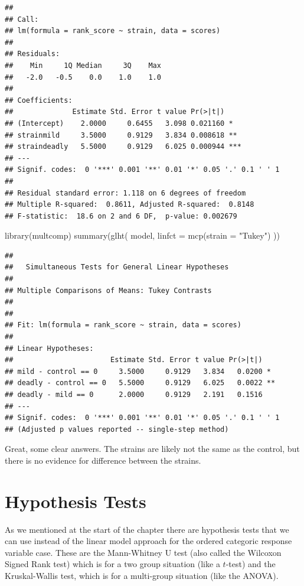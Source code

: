 \documentclass[
]{book}
\newenvironment{Shaded}{\begin{snugshade}}{\end{snugshade}}
\newcommand{\AttributeTok}[1]{\textcolor[rgb]{0.77,0.63,0.00}{#1}}
\newcommand{\FunctionTok}[1]{\textcolor[rgb]{0.00,0.00,0.00}{#1}}
\newcommand{\NormalTok}[1]{#1}
\newcommand{\StringTok}[1]{\textcolor[rgb]{0.31,0.60,0.02}{#1}}
\begin{document}
\begin{verbatim}
## 
## Call:
## lm(formula = rank_score ~ strain, data = scores)
## 
## Residuals:
##    Min     1Q Median     3Q    Max 
##   -2.0   -0.5    0.0    1.0    1.0 
## 
## Coefficients:
##              Estimate Std. Error t value Pr(>|t|)    
## (Intercept)    2.0000     0.6455   3.098 0.021160 *  
## strainmild     3.5000     0.9129   3.834 0.008618 ** 
## straindeadly   5.5000     0.9129   6.025 0.000944 ***
## ---
## Signif. codes:  0 '***' 0.001 '**' 0.01 '*' 0.05 '.' 0.1 ' ' 1
## 
## Residual standard error: 1.118 on 6 degrees of freedom
## Multiple R-squared:  0.8611,	Adjusted R-squared:  0.8148 
## F-statistic:  18.6 on 2 and 6 DF,  p-value: 0.002679
\end{verbatim}

\begin{Shaded}
\begin{Highlighting}[]
\FunctionTok{library}\NormalTok{(multcomp)}
\FunctionTok{summary}\NormalTok{(}\FunctionTok{glht}\NormalTok{(}
\NormalTok{  model, }\AttributeTok{linfct =} \FunctionTok{mcp}\NormalTok{(}\AttributeTok{strain =} \StringTok{"Tukey"}\NormalTok{)}
\NormalTok{))}
\end{Highlighting}
\end{Shaded}

\begin{verbatim}
## 
## 	 Simultaneous Tests for General Linear Hypotheses
## 
## Multiple Comparisons of Means: Tukey Contrasts
## 
## 
## Fit: lm(formula = rank_score ~ strain, data = scores)
## 
## Linear Hypotheses:
##                       Estimate Std. Error t value Pr(>|t|)   
## mild - control == 0     3.5000     0.9129   3.834   0.0200 * 
## deadly - control == 0   5.5000     0.9129   6.025   0.0022 **
## deadly - mild == 0      2.0000     0.9129   2.191   0.1516   
## ---
## Signif. codes:  0 '***' 0.001 '**' 0.01 '*' 0.05 '.' 0.1 ' ' 1
## (Adjusted p values reported -- single-step method)
\end{verbatim}

Great, some clear answers. The strains are likely not the same as the control, but there is no evidence for difference between the strains.

\hypertarget{hypothesis-tests}{%
\section{Hypothesis Tests}\label{hypothesis-tests}}

As we mentioned at the start of the chapter there are hypothesis tests that we can use instead of the linear model approach for the ordered categoric response variable case. These are the Mann-Whitney U test (also called the Wilcoxon Signed Rank test) which is for a two group situation (like a \(t\)-test) and the Kruskal-Wallis test, which is for a multi-group situation (like the ANOVA).
\end{document}

